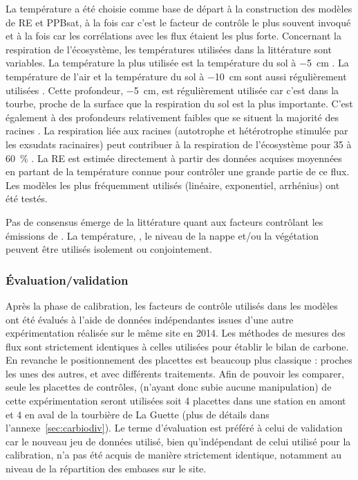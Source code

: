 La température a été choisie comme base de départ à la construction des modèles de RE et PPBsat, à la fois car c'est le facteur de contrôle le plus souvent invoqué et à la fois car les corrélations avec les flux étaient les plus forte.
Concernant la respiration de l'écosystème, les températures utilisées dans la littérature sont variables.
La température la plus utilisée est la température du sol à \SI{-5}{\centi\metre}  \citep{ballantyne2014}.
La température de l'air et la température du sol à \SI{-10}{\centi\metre} sont aussi régulièrement utilisées \citep{bortoluzzi2006a,kim1992}.
Cette profondeur, \SI{-5}{\cm}, est régulièrement utilisée car c'est dans la tourbe, proche de la surface que la respiration du sol est la plus importante.
\plop %
C'est également à des profondeurs relativement faibles que se situent la majorité des racines \plop.
La respiration liée aux racines (autotrophe et hétérotrophe stimulée par les exsudats racinaires) peut contribuer à la respiration de l'écosystème pour 35 à \SI{60}{\percent} \citep{silvola1996,crow2005}.
La RE est estimée directement à partir des données acquises moyennées en partant de la température connue pour contrôler une grande partie de ce flux.
Les modèles les plus fréquemment utilisés (linéaire, exponentiel, arrhénius) ont été testés.

Pas de consensus émerge de la littérature quant aux facteurs contrôlant les émissions de \chh.
La température, \citep{alm1999,bubier1995b}, le niveau de la nappe \citep{bubier1993} et/ou la végétation \citep{bortoluzzi2006a} peuvent être utilisés isolement ou conjointement.

\subsubsection{Évaluation/validation}

Après la phase de calibration, les facteurs de contrôle utilisés dans les modèles ont été évalués à l'aide de données indépendantes issues d'une autre expérimentation réalisée sur le même site en 2014.
Les méthodes de mesures des flux sont strictement identiques à celles utilisées pour établir le bilan de carbone.
En revanche le positionnement des placettes est beaucoup plus classique : proches les unes des autres, et avec différents traitements.
Afin de pouvoir les comparer, seule les placettes de contrôles, (n'ayant donc subie aucune manipulation) de cette expérimentation seront utilisées soit 4 placettes dans une station en amont et 4 en aval de la tourbière de La Guette (plus de détails dans l'annexe~\ref{sec:carbiodiv}).
Le terme d'évaluation est préféré à celui de validation car le nouveau jeu de données utilisé, bien qu'indépendant de celui utilisé pour la calibration, n'a pas été acquis de manière strictement identique, notamment au niveau de la répartition des embases sur le site.

